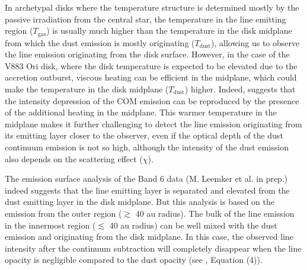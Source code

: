 \documentclass[linenumbers, twocolumn, twocolappendix, astrosymb, times]{aastex631}
\begin{document}
In archetypal disks where the temperature structure is determined mostly by the passive irradiation from the central star, the temperature in the line emitting region ($T_\mathrm{gas}$) is usually much higher than the temperature in the disk midplane from which the dust emission is mostly originating ($T_\mathrm{dust}$), allowing us to observe the line emission originating from the disk surface. However, in the case of the V883 Ori disk, where the disk temperature is expected to be elevated due to the accretion outburst, viscous heating can be efficient in the midplane, which could make the temperature in the disk midplane ($T_\mathrm{dust}$) higher. Indeed, \citet{Lee2019} suggests that the intensity depression of the COM emission can be reproduced by the presence of the additional heating in the midplane. This warmer temperature in the midplane makes it further challenging to detect the line emission originating from its emitting layer closer to the observer, even if the optical depth of the dust continuum emission is not so high, although the intensity of the dust emission also depends on the scattering effect ($\chi$). 

The emission surface analysis of the Band 6 data (M. Leemker et al. in prep.) indeed suggests that the line emitting layer is separated and elevated from the dust emitting layer in the disk midplane. But this analysis is based on the emission from the outer region ($\gtrsim$ 40 au radius).
The bulk of the line emission in the innermost region ($\lesssim$ 40 au radius) can be well mixed with the dust emission and originating from the disk midplane. In this case, the observed line intensity after the continuum subtraction will completely disappear when the line opacity is negligible compared to the dust opacity (see \citealt{Bosman2021}, Equation (4)). 


\end{document}
